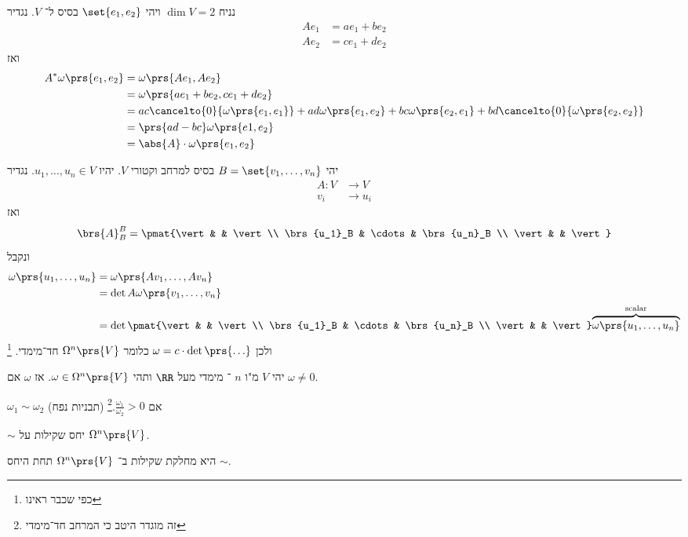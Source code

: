 \documentclass[a4paper,10pt,twoside,openany]{book}
\begin{document}
\begin{example}
נניח
$\dim V = 2$
ויהי
$\set{e_1, e_2}$
בסיס ל־%
$V$.
נגדיר
\begin{align*}
A e_1 &= a e_1 + be_2 \\
A e_2 &= ce_1 + de_2
\end{align*}
ואז
\begin{align*}
A^* \omega\prs{e_1, e_2} &= \omega\prs{A e_1, A e_2} \\
&= \omega\prs{a e_1 + be_2, ce_1 + de_2} \\
&= ac \cancelto{0}{\omega\prs{e_1, e_1}} + ad \omega\prs{e_1, e_2} + bc\omega\prs{e_2, e_1} + bd\cancelto{0}{\omega\prs{e_2, e_2}} \\
&= \prs{ad - bc} \omega\prs{e1, e_2} \\
&= \abs{A} \cdot \omega\prs{e_1, e_2}
\end{align*}
\end{example}
\begin{corollary}
יהי
$B = \set{v_1, \ldots, v_n}$
בסיס למרחב וקטורי
$V$.
יהיו
$u_1, \ldots, u_n \in V$.
נגדיר
\begin{align*}
A \colon V &\to V \\
v_i &\to u_i
\end{align*}
ואז
\[\brs{A}_B^B = \pmat{\vert & & \vert \\ \brs{u_1}_B & \cdots & \brs{u_n}_B \\ \vert & & \vert}\]
ונקבל
\begin{align*}
\omega\prs{u_1, \ldots, u_n} &= \omega\prs{A v_1, \ldots, A v_n} \\&= \det A \omega\prs{v_1, \ldots, v_n} \\&= \det \pmat{\vert & & \vert \\ \brs{u_1}_B & \cdots & \brs{u_n}_B \\ \vert & & \vert} \overset{\text{scalar}}{\overbrace{\omega\prs{u_1, \ldots, u_n}}}
\end{align*}
ולכן
$\omega = c \cdot \det\prs{\ldots}$
כלומר
$\Omega^n\prs{V}$
חד־מימדי.%
\footnote{כפי שכבר ראינו}
\end{corollary}
\begin{definition}
יהי
$V$
מ"ו
$n$%
־%
מימדי מעל
$\RR$
ותהי
$\omega \in \Omega^n\prs{V}$.
אז
$\omega$
אם
$\omega \neq 0$.
\end{definition}
\begin{definition}
$\omega_1 \sim \omega_2$
(תבניות נפח)
אם
$\frac{\omega_1}{\omega_2} > 0$.\footnote{זה מוגדר היטב כי המרחב חד־מימדי}
\end{definition}
\begin{remark}
$\sim$
יחס שקילות על
$\Omega^n\prs{V}$.
\end{remark}
\begin{definition}
היא מחלקת שקילות ב־%
$\Omega^n\prs{V}$
תחת היחס
$\sim$.
\end{definition}
\end{document}
